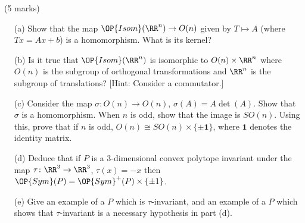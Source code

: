 \documentclass[12pt]{article}
\begin{document}
\begin{question}\ (5 marks)\\
  \begin{enumerate}
  \item[(a)] Show that the map $\OP{Isom}(\RR^n)\to O(n)$ given by $T\mapsto A$ (where $Tx=Ax+b$) is a homomorphism. What is its kernel?
  \item[(b)] Is it true that $\OP{Isom}(\RR^n)$ is isomorphic to $O(n)\times\RR^n$ where $O(n)$ is the subgroup of orthogonal transformations and $\RR^n$ is the subgroup of translations? [Hint: Consider a commutator.]
  \item[(c)] Consider the map $\sigma\colon O(n)\to O(n)$, $\sigma(A)=A\det(A)$. Show that $\sigma$ is a homomorphism. When $n$ is odd, show that the image is $SO(n)$. Using this, prove that if $n$ is odd, $O(n)\cong SO(n)\times\{\pm \mathbf{1}\}$, where $\mathbf{1}$ denotes the identity matrix.
  \item[(d)] Deduce that if $P$ is a 3-dimensional convex polytope invariant under the map $\tau\colon\RR^3\to\RR^3$, $\tau(x)=-x$ then $\OP{Sym}(P)=\OP{Sym}^+(P)\times\{\pm 1\}$.
  \item[(e)] Give an example of a $P$ which is $\tau$-invariant, and an example of a $P$ which shows that $\tau$-invariant is a necessary hypothesis in part (d).
  \end{enumerate}
\end{question}
\iffalse
\begin{answer}
  \begin{enumerate}
  \item[(a)] If $Sx=Ax+b$ and $Tx=Cx+d$ then $STx=A(Cx+d)+b=ACx+Ad+b$ so $ST\mapsto AC$, as required. The kernel is the group of translations.
  \item[(b)] We saw in Question 1 that if $Sx=Ax+b$ and $Tx=x+c$ then $STS^{-1}x=x+Ac$. Therefore $T^{-1}STS^{-1}x=x+Ac-c$ which is not the identity unless $c$ is fixed by $A$. Therefore there are elements of $O(n)$ and of the translation subgroup which do not commute (as they would if the group were a direct product).
  \item[(c)] We have $AB\det(AB)=AB\det(A)\det(B)=A\det(A) B\det(B)$ as required. $A\det A$ has determinant $\det(A)^{n+1}$ so this is always equal to 1 when $n$ is odd (since $\det(A)=\pm 1$) and the image of $\sigma$ is contained in $SO(n)$; moreover, $\sigma(A)=A$ when $A\in SO(n)$, so the image equals $SO(n)$. Therefore the map $A\mapsto (A\det A,\det A)$ is a homomorphism $O(n)\to SO(n)\times\{\pm 1\}$. It is clearly bijective because $A=A\det A/\det A$.
  \item[(d)] If $P$ is invariant under $\tau$ then $-\mathbf{1}\in O(n)$ is in $\OP{Sym}(P)$ and hence $A\det A\in\OP{Sym}^+(P)$ for any $A\in\OP{Sym}(P)$. So, as in (c), $A\mapsto (A\det A,\det A)$ gives the desired isomorphism.
  \item[(e)] The cube is $\tau$-invariant. The tetrahedron is not, and $\OP{Sym}^+(T)=A_4$, $\OP{Sym}(T)=S_4$ and $S_4$ is not a direct product of $A_4$ with $\{\pm 1\}$.
  \end{enumerate}
\end{answer}
\fi
\end{document}
